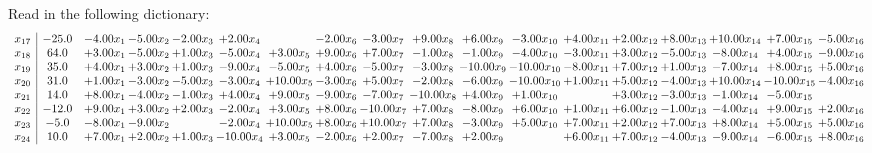 \documentclass[9pt]{article}
\begin{document}
Read in the following dictionary:
\[\begin{array}{c| c c@{\hskip 2pt} c@{\hskip 2pt} c@{\hskip 2pt} c@{\hskip 2pt} c@{\hskip 2pt} c@{\hskip 2pt} c@{\hskip 2pt} c@{\hskip 2pt} c@{\hskip 2pt} c@{\hskip 2pt} c@{\hskip 2pt} c@{\hskip 2pt} c@{\hskip 2pt} c@{\hskip 2pt} c@{\hskip 2pt} c@{\hskip 2pt} }
 x_{17}   &  -25.0 & -4.00 x_{1} & -5.00 x_{2} & -2.00 x_{3} & +  2.00 x_{4} &   & -2.00 x_{6} & -3.00 x_{7} & +  9.00 x_{8} & +  6.00 x_{9} & -3.00 x_{10} & +  4.00 x_{11} & +  2.00 x_{12} & +  8.00 x_{13} & + 10.00 x_{14} & +  7.00 x_{15} & -5.00 x_{16}\\
 x_{18}   &  64.0 & +  3.00 x_{1} & -5.00 x_{2} & +  1.00 x_{3} & -5.00 x_{4} & +  3.00 x_{5} & +  9.00 x_{6} & +  7.00 x_{7} & -1.00 x_{8} & -1.00 x_{9} & -4.00 x_{10} & -3.00 x_{11} & +  3.00 x_{12} & -5.00 x_{13} & -8.00 x_{14} & +  4.00 x_{15} & -9.00 x_{16}\\
 x_{19}   &  35.0 & +  4.00 x_{1} & +  3.00 x_{2} & +  1.00 x_{3} & -9.00 x_{4} & -5.00 x_{5} & +  4.00 x_{6} & -5.00 x_{7} & -3.00 x_{8} & -10.00 x_{9} & -10.00 x_{10} & -8.00 x_{11} & +  7.00 x_{12} & +  1.00 x_{13} & -7.00 x_{14} & +  8.00 x_{15} & +  5.00 x_{16}\\
 x_{20}   &  31.0 & +  1.00 x_{1} & -3.00 x_{2} & -5.00 x_{3} & -3.00 x_{4} & + 10.00 x_{5} & -3.00 x_{6} & +  5.00 x_{7} & -2.00 x_{8} & -6.00 x_{9} & -10.00 x_{10} & +  1.00 x_{11} & +  5.00 x_{12} & -4.00 x_{13} & + 10.00 x_{14} & -10.00 x_{15} & -4.00 x_{16}\\
 x_{21}   &  14.0 & +  8.00 x_{1} & -4.00 x_{2} & -1.00 x_{3} & +  4.00 x_{4} & +  9.00 x_{5} & -9.00 x_{6} & -7.00 x_{7} & -10.00 x_{8} & +  4.00 x_{9} & +  1.00 x_{10} &   & +  3.00 x_{12} & -3.00 x_{13} & -1.00 x_{14} & -5.00 x_{15} &   \\
 x_{22}   &  -12.0 & +  9.00 x_{1} & +  3.00 x_{2} & +  2.00 x_{3} & -2.00 x_{4} & +  3.00 x_{5} & +  8.00 x_{6} & -10.00 x_{7} & +  7.00 x_{8} & -8.00 x_{9} & +  6.00 x_{10} & +  1.00 x_{11} & +  6.00 x_{12} & -1.00 x_{13} & -4.00 x_{14} & +  9.00 x_{15} & +  2.00 x_{16}\\
 x_{23}   &  -5.0 & -8.00 x_{1} & -9.00 x_{2} &   & -2.00 x_{4} & + 10.00 x_{5} & +  8.00 x_{6} & + 10.00 x_{7} & +  7.00 x_{8} & -3.00 x_{9} & +  5.00 x_{10} & +  7.00 x_{11} & +  2.00 x_{12} & +  7.00 x_{13} & +  8.00 x_{14} & +  5.00 x_{15} & +  5.00 x_{16}\\
 x_{24}   &  10.0 & +  7.00 x_{1} & +  2.00 x_{2} & +  1.00 x_{3} & -10.00 x_{4} & +  3.00 x_{5} & -2.00 x_{6} & +  2.00 x_{7} & -7.00 x_{8} & +  2.00 x_{9} &   & +  6.00 x_{11} & +  7.00 x_{12} & -4.00 x_{13} & -9.00 x_{14} & -6.00 x_{15} & +  8.00 x_{16}\\

\end{array}\]
\end{document}
